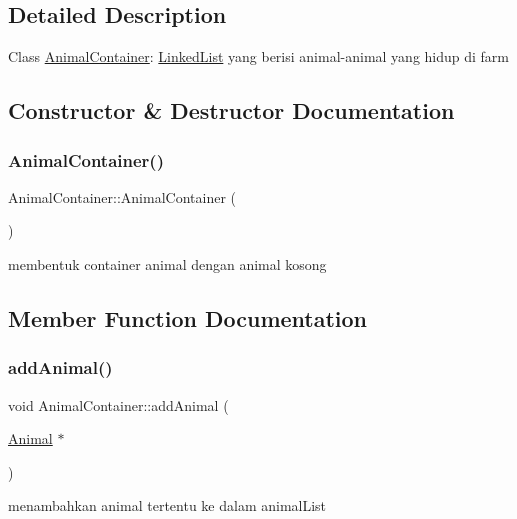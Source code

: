 \subsection{Detailed Description}
Class \mbox{\hyperlink{class_animal_container}{Animal\+Container}}\+: \mbox{\hyperlink{class_linked_list}{Linked\+List}} yang berisi animal-\/animal yang hidup di farm 

\subsection{Constructor \& Destructor Documentation}
\mbox{\label{class_animal_container_a420f7da157311e3ec55f2b963baf83bc}} 
\subsubsection{\texorpdfstring{AnimalContainer()}{AnimalContainer()}}
{\footnotesize\ttfamily Animal\+Container\+::\+Animal\+Container (\begin{DoxyParamCaption}{ }\end{DoxyParamCaption})}

membentuk container animal dengan animal kosong 

\subsection{Member Function Documentation}
\mbox{\label{class_animal_container_a39a176984bf7625f6366c824cb6d79de}} 
\subsubsection{\texorpdfstring{addAnimal()}{addAnimal()}}
{\footnotesize\ttfamily void Animal\+Container\+::add\+Animal (\begin{DoxyParamCaption}\item[{\mbox{\hyperlink{class_animal}{Animal}} $\ast$}]{ }\end{DoxyParamCaption})}

menambahkan animal tertentu ke dalam animal\+List \mbox{\label{class_animal_container_afef91ad4df3c18b9fc6c2995783887dd}} 
